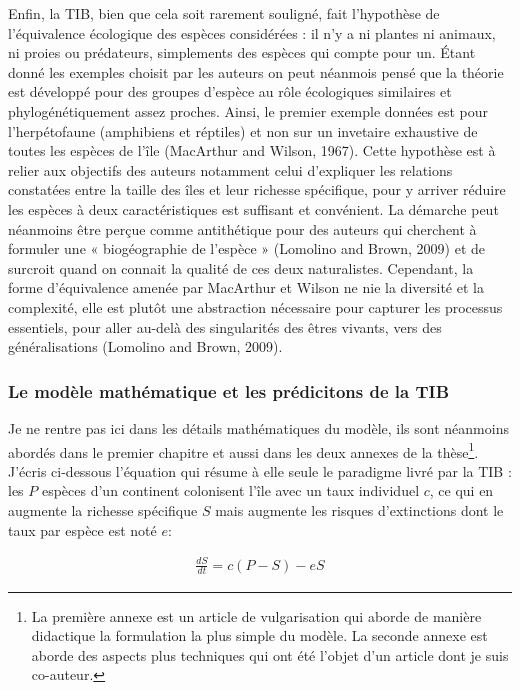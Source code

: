 Enfin, la TIB, bien que cela soit rarement souligné, fait l'hypothèse de
l'équivalence écologique des espèces considérées : il n'y a ni plantes
ni animaux, ni proies ou prédateurs, simplements des espèces qui compte
pour un. Étant donné les exemples choisit par les auteurs on peut
néanmois pensé que la théorie est développé pour des groupes d'espèce au
rôle écologiques similaires et phylogénétiquement assez proches. Ainsi,
le premier exemple données est pour l'herpétofaune (amphibiens et
réptiles) et non sur un invetaire exhaustive de toutes les espèces de
l'île (MacArthur and Wilson, 1967). Cette hypothèse est à relier aux
objectifs des auteurs notamment celui d'expliquer les relations
constatées entre la taille des îles et leur richesse spécifique, pour y
arriver réduire les espèces à deux caractéristiques est suffisant et
convénient. La démarche peut néanmoins être perçue comme antithétique
pour des auteurs qui cherchent à formuler une « biogéographie de
l'espèce » (Lomolino and Brown, 2009) et de surcroit quand on connait la
qualité de ces deux naturalistes. Cependant, la forme d'équivalence
amenée par MacArthur et Wilson ne nie la diversité et la complexité,
elle est plutôt une abstraction nécessaire pour capturer les processus
essentiels, pour aller au-delà des singularités des êtres vivants, vers
des généralisations (Lomolino and Brown, 2009).

\subsubsection*{Le modèle mathématique et les prédicitons de la
TIB}\label{le-moduxe8le-mathuxe9matique-et-les-pruxe9dicitons-de-la-tib}

Je ne rentre pas ici dans les détails mathématiques du modèle, ils sont
néanmoins abordés dans le premier chapitre et aussi dans les deux
annexes de la thèse\footnote{La première annexe est un article de
  vulgarisation qui aborde de manière didactique la formulation la plus
  simple du modèle. La seconde annexe est aborde des aspects plus
  techniques qui ont été l'objet d'un article dont je suis co-auteur.}.
J'écris ci-dessous l'équation qui résume à elle seule le paradigme livré
par la TIB : les \(P\) espèces d'un continent colonisent l'île avec un
taux individuel \(c\), ce qui en augmente la richesse spécifique \(S\)
mais augmente les risques d'extinctions dont le taux par espèce est noté
\(e\):

\begin{eqnarray}
\label{eqMW}
\frac{dS}{dt} = c(P-S)-eS
\end{eqnarray}

